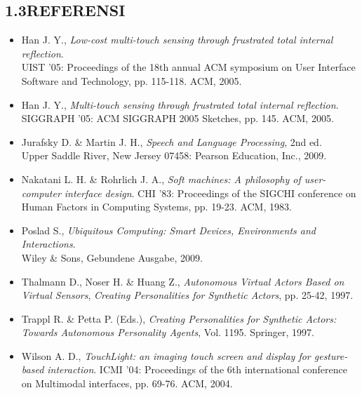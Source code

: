 \subsection*{\textsf{\normalsize 1.3\hspace{0.5cm}REFERENSI}}

\begin{itemize}
\item Han J. Y., \emph{Low-cost multi-touch sensing through frustrated total internal reflection}.\\ 
  UIST '05: Proceedings of the 18th annual ACM symposium on User Interface Software and Technology, pp. 115-118. ACM, 2005.
\item Han J. Y., \emph{Multi-touch sensing through frustrated total internal reflection}.\\
  SIGGRAPH '05: ACM SIGGRAPH 2005 Sketches, pp. 145. ACM, 2005.
\item Jurafsky D. \& Martin J. H., \emph{Speech and Language Processing}, 2nd ed.\\
  Upper Saddle River, New Jersey 07458: Pearson Education, Inc., 2009.
\item Nakatani L. H. \& Rohrlich J. A., \emph{Soft machines: A philosophy of user-computer interface design}.
  CHI '83: Proceedings of the SIGCHI conference on Human Factors in Computing Systems, pp. 19-23. ACM, 1983.
\item Poslad S., \emph{Ubiquitous Computing: Smart Devices, Environments and Interactions}.\\
  Wiley \& Sons, Gebundene Ausgabe, 2009.
\item Thalmann D., Noser H. \& Huang Z., \emph{Autonomous Virtual Actors Based on Virtual Sensors}, \emph{Creating Personalities for Synthetic Actors}, pp. 25-42, 1997.
\item Trappl R. \& Petta P. (Eds.), \emph{Creating Personalities for Synthetic Actors: Towards Autonomous Personality Agents}, Vol. 1195. Springer, 1997.
\item Wilson A. D., \emph{TouchLight: an imaging touch screen and display for gesture-based interaction}.
  ICMI '04: Proceedings of the 6th international conference on Multimodal interfaces, pp. 69-76. ACM, 2004.
\end{itemize}
